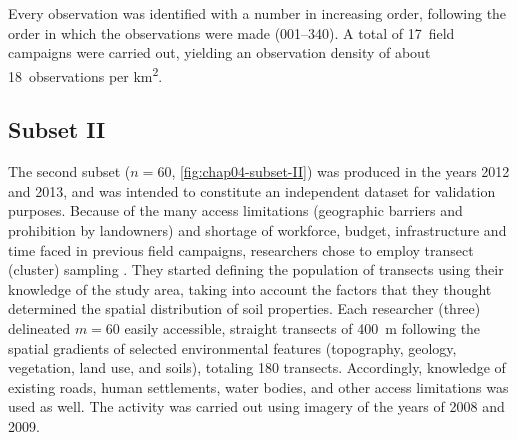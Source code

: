 Every observation was identified with a number in increasing order, following the order in which the 
observations were made (\num{001}--\num{340}). A total of \num{17}~field campaigns were carried out, yielding 
an observation density of about \num{18}~observations per \si{\kilo\metre\squared}.

\subsection{Subset II}
\label{sec:chap04-subset-ii}

The second subset ($n = 60$, \autoref{fig:chap04-subset-II}) was produced in the years \num{2012} and 
\num{2013}, and was intended to constitute an independent dataset for validation purposes. Because of the many 
access limitations (geographic barriers and prohibition by landowners) and shortage of workforce, budget, 
infrastructure and time faced in previous field campaigns, researchers chose to employ transect (cluster) 
sampling \cite{MiguelEtAl2012, Moura-BuenoEtAl2012, Samuel-RosaEtAl2013}. They started defining the population 
of transects using their knowledge of the study area, taking into account the factors that they thought 
determined the spatial distribution of soil properties. Each researcher (three) delineated $m = 60$ easily 
accessible, straight transects of \SI{400}{\metre} following the spatial gradients of selected environmental 
features (topography, geology, vegetation, land use, and soils), totaling 180 transects. Accordingly, 
knowledge of existing roads, human settlements, water bodies, and other access limitations was used as well. 
The activity was carried out using \googlearth{} imagery of the years of \num{2008} and \num{2009}.

